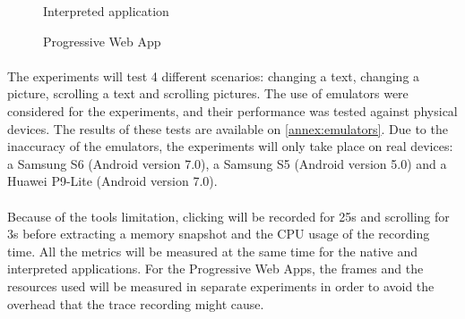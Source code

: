 \documentclass{kththesis}
\begin{document}
\begin{figure}
    \centering
    \hfill
    \hfill
    \hfill
    \hfill
    \caption{Interpreted application}
    \label{fig:hybrid_screens}
\end{figure}

\begin{figure}
    \centering
    \hfill
    \hfill
    \hfill
    \hfill
    \caption{Progressive Web App}
    \label{fig:pwa_screens}
\end{figure}

\paragraph{}
The experiments will test 4 different scenarios: changing a text, changing a picture, scrolling a text and scrolling pictures. The use of emulators were considered for the experiments, and their performance was tested against physical devices. The results of these tests are available on \autoref{annex:emulators}. Due to the inaccuracy of the emulators, the experiments will only take place on real devices: a Samsung S6 (Android version 7.0), a Samsung S5 (Android version 5.0) and a Huawei P9-Lite (Android version 7.0).
\paragraph{}
Because of the tools limitation, clicking will be recorded for 25s and scrolling for 3s before extracting a memory snapshot and the CPU usage of the recording time. All the metrics will be measured at the same time for the native and interpreted applications. For the Progressive Web Apps, the frames and the resources used will be measured in separate experiments in order to avoid the overhead that the trace recording might cause.
\end{document}
